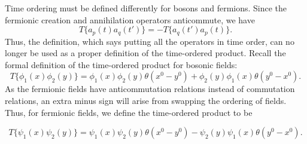 \documentclass[11pt]{article}
\theoremstyle{definition}
\begin{document}
Time ordering must be defined differently for bosons and fermions. Since the fermionic creation and annihilation operators anticommute, we have
\begin{equation}
    T\{a_p(t)a_q(t')\} = -T\{a_q(t')a_p(t)\}.
\end{equation}
Thus, the definition, which says putting all the operators in time order, can no longer be used as a proper definition of the time-ordered product. Recall the formal definition of the time-ordered product for bosonic fields:
\begin{equation}
    T\{\phi_1(x)\phi_2(y)\} = \phi_1(x)\phi_2(y) \theta(x^0-y^0) + \phi_2(y)\phi_1(x) \theta(y^0-x^0). 
\end{equation}
As the fermionic fields have anticommutation relations instead of commutation relations, an extra minus sign will arise from swapping the ordering of fields. Thus, for fermionic fields, we define the time-ordered product to be
\begin{shaded}
    \begin{equation}
        T\{\psi_1(x)\psi_2(y)\} = \psi_1(x)\psi_2(y) \theta(x^0-y^0) - \psi_2(y)\psi_1(x) \theta(y^0-x^0).
    \end{equation}
\end{shaded}
\end{document}

